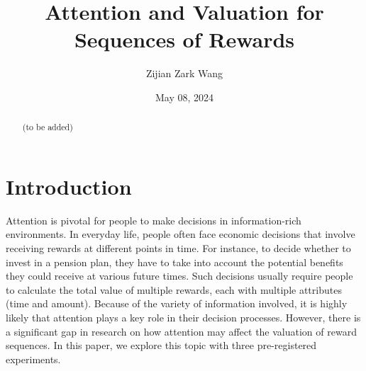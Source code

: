 \documentclass[
  12pt,
]{article}
\title{Attention and Valuation for Sequences of Rewards}
\author{Zijian Zark Wang}
\date{May 08, 2024}
\begin{document}
\maketitle
\begin{abstract}
(to be added)
\end{abstract}

\hypertarget{introduction}{%
\section{Introduction}\label{introduction}}

Attention is pivotal for people to make decisions in information-rich
environments. In everyday life, people often face economic decisions
that involve receiving rewards at different points in time. For
instance, to decide whether to invest in a pension plan, they have to
take into account the potential benefits they could receive at various
future times. Such decisions usually require people to calculate the
total value of multiple rewards, each with multiple attributes (time and
amount). Because of the variety of information involved, it is highly
likely that attention plays a key role in their decision processes.
However, there is a significant gap in research on how attention may
affect the valuation of reward sequences. In this paper, we explore this
topic with three pre-registered experiments.
\end{document}
